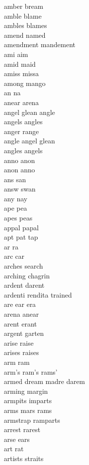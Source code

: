 amber bream\\
amble blame\\
ambles blames\\
amend named\\
amendment mandement\\
ami aim\\
amid maid\\
amiss missa\\
among mango\\
an na\\
anear arena\\
angel glean angle\\
angels angles\\
anger range\\
angle angel glean\\
angles angels\\
anno anon\\
anon anno\\
ans san\\
answ swan\\
any nay\\
ape pea\\
apes peas\\
appal papal\\
apt pat tap\\
ar ra\\
arc car\\
arches search\\
arching chagrin\\
ardent darent\\
ardenti rendita trained\\
are ear era\\
arena anear\\
arent erant\\
argent garten\\
arise raise\\
arises raises\\
arm ram\\
arm's ram's rams'\\
armed dream madre darem\\
arming margin\\
armpits imparts\\
arms mars rams\\
armstrap ramparts\\
arrest rarest\\
arse ears\\
art rat\\
artists straits\\
